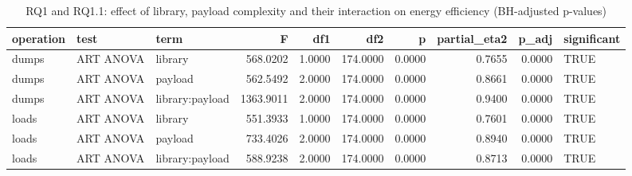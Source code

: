 \begin{table}[ht]
\centering
\begin{tabular}{lllrrrrrrl}
  \toprule
operation & test & term & F & df1 & df2 & p & partial\_eta2 & p\_adj & significant \\ 
  \midrule
dumps & ART ANOVA & library & 568.0202 & 1.0000 & 174.0000 & 0.0000 & 0.7655 & 0.0000 & TRUE \\ 
  dumps & ART ANOVA & payload & 562.5492 & 2.0000 & 174.0000 & 0.0000 & 0.8661 & 0.0000 & TRUE \\ 
  dumps & ART ANOVA & library:payload & 1363.9011 & 2.0000 & 174.0000 & 0.0000 & 0.9400 & 0.0000 & TRUE \\ 
  loads & ART ANOVA & library & 551.3933 & 1.0000 & 174.0000 & 0.0000 & 0.7601 & 0.0000 & TRUE \\ 
  loads & ART ANOVA & payload & 733.4026 & 2.0000 & 174.0000 & 0.0000 & 0.8940 & 0.0000 & TRUE \\ 
  loads & ART ANOVA & library:payload & 588.9238 & 2.0000 & 174.0000 & 0.0000 & 0.8713 & 0.0000 & TRUE \\ 
   \bottomrule
\end{tabular}
\caption{RQ1 and RQ1.1: effect of library, payload complexity and their interaction on energy efficiency (BH-adjusted p-values)} 
\label{tab:rq1_anova}
\end{table}
